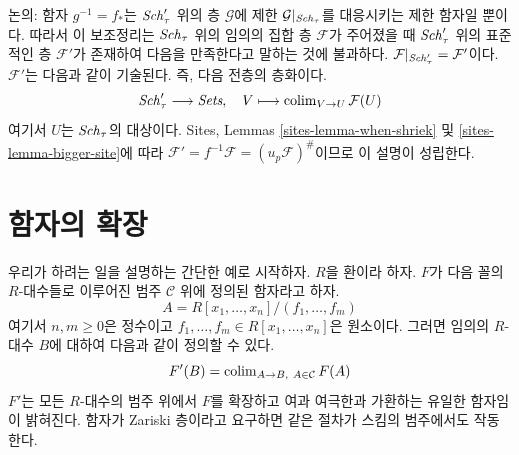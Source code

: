 \noindent
논의: 함자 $g^{-1} = f_*$는 $\mathit{Sch}'_\tau$ 위의 층 $\mathcal{G}$에 제한
$\mathcal{G}|_{\mathit{Sch}_\tau}$를 대응시키는 제한 함자일 뿐이다. 따라서 이
보조정리는 $\mathit{Sch}_\tau$ 위의 임의의 집합 층 $\mathcal{F}$가 주어졌을 때
$\mathit{Sch}'_\tau$ 위의 표준적인 층 $\mathcal{F}'$가 존재하여 다음을 만족한다고
말하는 것에 불과하다.
$\mathcal{F}|_{\mathit{Sch}'_\tau} = \mathcal{F}'$이다.
$\mathcal{F}'$는 다음과 같이 기술된다. 즉, 다음 전층의 층화이다.
$$
\mathit{Sch}'_\tau \longrightarrow \textit{Sets}, \quad
V \longmapsto \mathop{\mathrm{colim}}\nolimits_{V \to U} \mathcal{F}(U)
$$
여기서 $U$는 $\mathit{Sch}_\tau$의 대상이다. Sites, Lemmas
\ref{sites-lemma-when-shriek} 및 \ref{sites-lemma-bigger-site}에 따라
$\mathcal{F}' = f^{-1}\mathcal{F} = (u_p\mathcal{F})^\#$이므로 이 설명이
성립한다.






\section{함자의 확장}
\label{section-extending-functors}

\noindent
우리가 하려는 일을 설명하는 간단한 예로 시작하자. $R$을 환이라 하자.
$F$가 다음 꼴의 $R$-대수들로 이루어진 범주 $\mathcal{C}$ 위에 정의된
함자라고 하자.
$$
A = R[x_1, \ldots, x_n]/(f_1, \ldots, f_m)
$$
여기서 $n, m \geq 0$은 정수이고
$f_1, \ldots, f_m \in R[x_1, \ldots, x_n]$은 원소이다. 그러면 임의의
$R$-대수 $B$에 대하여 다음과 같이 정의할 수 있다.
$$
F'(B) = \mathop{\mathrm{colim}}\nolimits_{A \to B,\ A \in \mathcal{C}} F(A)
$$
$F'$는 모든 $R$-대수의 범주 위에서 $F$를 확장하고 여과 여극한과
가환하는 유일한 함자임이 밝혀진다. 함자가 Zariski 층이라고 요구하면 같은
절차가 스킴의 범주에서도 작동한다.

